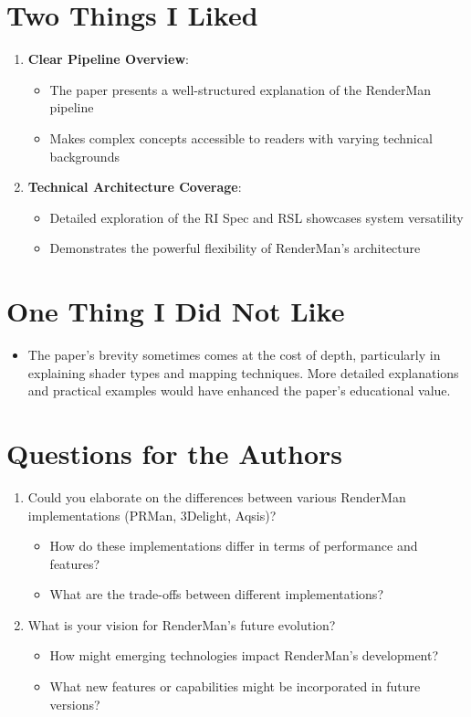 \documentclass[12pt]{article}
\begin{document}
\section{Two Things I Liked}
\begin{enumerate}[noitemsep]
    \item \textbf{Clear Pipeline Overview}:
    \begin{itemize}[noitemsep]
        \item The paper presents a well-structured explanation of the RenderMan pipeline
        \item Makes complex concepts accessible to readers with varying technical backgrounds
    \end{itemize}
    \item \textbf{Technical Architecture Coverage}:
    \begin{itemize}[noitemsep]
        \item Detailed exploration of the RI Spec and RSL showcases system versatility
        \item Demonstrates the powerful flexibility of RenderMan's architecture
    \end{itemize}
\end{enumerate}

\section{One Thing I Did Not Like}
\begin{itemize}[noitemsep]
    \item The paper's brevity sometimes comes at the cost of depth, particularly in explaining shader types and mapping techniques. More detailed explanations and practical examples would have enhanced the paper's educational value.
\end{itemize}

\section{Questions for the Authors}
\begin{enumerate}[noitemsep]
    \item Could you elaborate on the differences between various RenderMan implementations (PRMan, 3Delight, Aqsis)?
    \begin{itemize}[noitemsep]
        \item How do these implementations differ in terms of performance and features?
        \item What are the trade-offs between different implementations?
    \end{itemize}
    \item What is your vision for RenderMan's future evolution?
    \begin{itemize}[noitemsep]
        \item How might emerging technologies impact RenderMan's development?
        \item What new features or capabilities might be incorporated in future versions?
    \end{itemize}
\end{enumerate}
\end{document}
